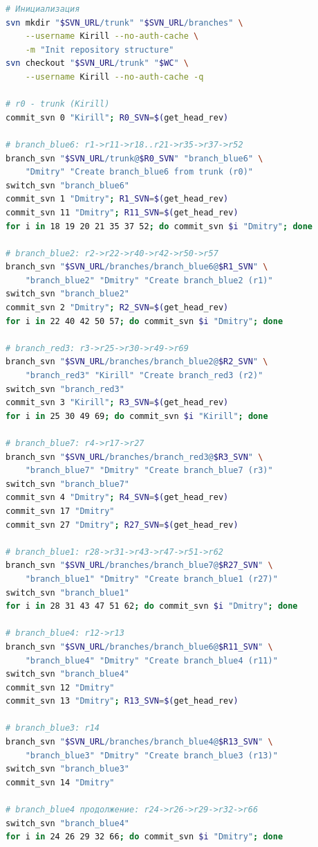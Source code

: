 \documentclass[12pt,a4paper]{article}
\begin{document}
\begin{lstlisting}[language=bash]
# Инициализация
svn mkdir "$SVN_URL/trunk" "$SVN_URL/branches" \
    --username Kirill --no-auth-cache \
    -m "Init repository structure"
svn checkout "$SVN_URL/trunk" "$WC" \
    --username Kirill --no-auth-cache -q

# r0 - trunk (Kirill)
commit_svn 0 "Kirill"; R0_SVN=$(get_head_rev)

# branch_blue6: r1->r11->r18..r21->r35->r37->r52
branch_svn "$SVN_URL/trunk@$R0_SVN" "branch_blue6" \
    "Dmitry" "Create branch_blue6 from trunk (r0)"
switch_svn "branch_blue6"
commit_svn 1 "Dmitry"; R1_SVN=$(get_head_rev)
commit_svn 11 "Dmitry"; R11_SVN=$(get_head_rev)
for i in 18 19 20 21 35 37 52; do commit_svn $i "Dmitry"; done

# branch_blue2: r2->r22->r40->r42->r50->r57
branch_svn "$SVN_URL/branches/branch_blue6@$R1_SVN" \
    "branch_blue2" "Dmitry" "Create branch_blue2 (r1)"
switch_svn "branch_blue2"
commit_svn 2 "Dmitry"; R2_SVN=$(get_head_rev)
for i in 22 40 42 50 57; do commit_svn $i "Dmitry"; done

# branch_red3: r3->r25->r30->r49->r69
branch_svn "$SVN_URL/branches/branch_blue2@$R2_SVN" \
    "branch_red3" "Kirill" "Create branch_red3 (r2)"
switch_svn "branch_red3"
commit_svn 3 "Kirill"; R3_SVN=$(get_head_rev)
for i in 25 30 49 69; do commit_svn $i "Kirill"; done

# branch_blue7: r4->r17->r27
branch_svn "$SVN_URL/branches/branch_red3@$R3_SVN" \
    "branch_blue7" "Dmitry" "Create branch_blue7 (r3)"
switch_svn "branch_blue7"
commit_svn 4 "Dmitry"; R4_SVN=$(get_head_rev)
commit_svn 17 "Dmitry"
commit_svn 27 "Dmitry"; R27_SVN=$(get_head_rev)

# branch_blue1: r28->r31->r43->r47->r51->r62
branch_svn "$SVN_URL/branches/branch_blue7@$R27_SVN" \
    "branch_blue1" "Dmitry" "Create branch_blue1 (r27)"
switch_svn "branch_blue1"
for i in 28 31 43 47 51 62; do commit_svn $i "Dmitry"; done

# branch_blue4: r12->r13
branch_svn "$SVN_URL/branches/branch_blue6@$R11_SVN" \
    "branch_blue4" "Dmitry" "Create branch_blue4 (r11)"
switch_svn "branch_blue4"
commit_svn 12 "Dmitry"
commit_svn 13 "Dmitry"; R13_SVN=$(get_head_rev)

# branch_blue3: r14
branch_svn "$SVN_URL/branches/branch_blue4@$R13_SVN" \
    "branch_blue3" "Dmitry" "Create branch_blue3 (r13)"
switch_svn "branch_blue3"
commit_svn 14 "Dmitry"

# branch_blue4 продолжение: r24->r26->r29->r32->r66
switch_svn "branch_blue4"
for i in 24 26 29 32 66; do commit_svn $i "Dmitry"; done


\end{lstlisting}
\end{document}
